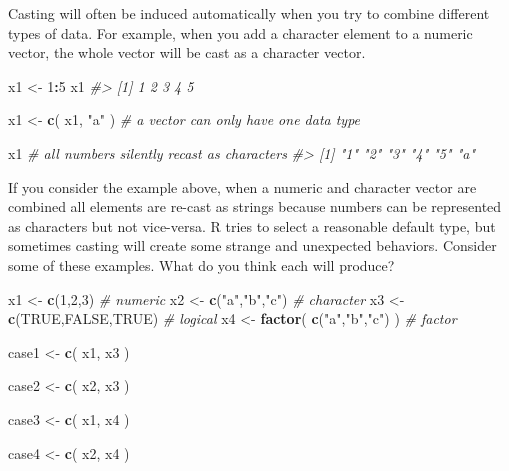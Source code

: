 \documentclass[]{book}
\newenvironment{Shaded}{\begin{snugshade}}{\end{snugshade}}
\newcommand{\CommentTok}[1]{\textcolor[rgb]{0.56,0.35,0.01}{\textit{#1}}}
\newcommand{\DecValTok}[1]{\textcolor[rgb]{0.00,0.00,0.81}{#1}}
\newcommand{\KeywordTok}[1]{\textcolor[rgb]{0.13,0.29,0.53}{\textbf{#1}}}
\newcommand{\NormalTok}[1]{#1}
\newcommand{\OperatorTok}[1]{\textcolor[rgb]{0.81,0.36,0.00}{\textbf{#1}}}
\newcommand{\OtherTok}[1]{\textcolor[rgb]{0.56,0.35,0.01}{#1}}
\newcommand{\StringTok}[1]{\textcolor[rgb]{0.31,0.60,0.02}{#1}}
\theoremstyle{definition}
\theoremstyle{definition}
\theoremstyle{definition}
\theoremstyle{remark}
\begin{document}
Casting will often be induced automatically when you try to combine
different types of data. For example, when you add a character element
to a numeric vector, the whole vector will be cast as a character
vector.

\begin{Shaded}
\begin{Highlighting}[]

\NormalTok{x1 <-}\StringTok{ }\DecValTok{1}\OperatorTok{:}\DecValTok{5}
\NormalTok{x1}
\CommentTok{#> [1] 1 2 3 4 5}

\NormalTok{x1 <-}\StringTok{ }\KeywordTok{c}\NormalTok{( x1, }\StringTok{"a"}\NormalTok{ ) }\CommentTok{# a vector can only have one data type}

\NormalTok{x1 }\CommentTok{# all numbers silently recast as characters}
\CommentTok{#> [1] "1" "2" "3" "4" "5" "a"}
\end{Highlighting}
\end{Shaded}

If you consider the example above, when a numeric and character vector
are combined all elements are re-cast as strings because numbers can be
represented as characters but not vice-versa. R tries to select a
reasonable default type, but sometimes casting will create some strange
and unexpected behaviors. Consider some of these examples. What do you
think each will produce?

\begin{Shaded}
\begin{Highlighting}[]

\NormalTok{x1 <-}\StringTok{ }\KeywordTok{c}\NormalTok{(}\DecValTok{1}\NormalTok{,}\DecValTok{2}\NormalTok{,}\DecValTok{3}\NormalTok{)                    }\CommentTok{# numeric}
\NormalTok{x2 <-}\StringTok{ }\KeywordTok{c}\NormalTok{(}\StringTok{"a"}\NormalTok{,}\StringTok{"b"}\NormalTok{,}\StringTok{"c"}\NormalTok{)              }\CommentTok{# character}
\NormalTok{x3 <-}\StringTok{ }\KeywordTok{c}\NormalTok{(}\OtherTok{TRUE}\NormalTok{,}\OtherTok{FALSE}\NormalTok{,}\OtherTok{TRUE}\NormalTok{)          }\CommentTok{# logical}
\NormalTok{x4 <-}\StringTok{ }\KeywordTok{factor}\NormalTok{( }\KeywordTok{c}\NormalTok{(}\StringTok{"a"}\NormalTok{,}\StringTok{"b"}\NormalTok{,}\StringTok{"c"}\NormalTok{) )    }\CommentTok{# factor}

\NormalTok{case1 <-}\StringTok{ }\KeywordTok{c}\NormalTok{( x1, x3 )}

\NormalTok{case2 <-}\StringTok{ }\KeywordTok{c}\NormalTok{( x2, x3 )}

\NormalTok{case3 <-}\StringTok{ }\KeywordTok{c}\NormalTok{( x1, x4 )}

\NormalTok{case4 <-}\StringTok{ }\KeywordTok{c}\NormalTok{( x2, x4 )}
\end{Highlighting}
\end{Shaded}
\end{document}
